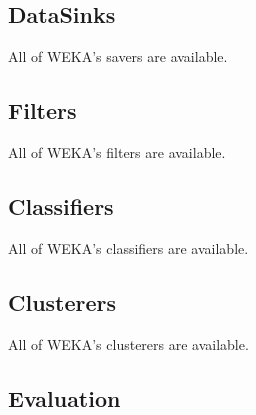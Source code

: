 \documentclass[a4paper]{article}
\begin{document}
\subsection{DataSinks} All of WEKA's savers are available.
\begin{center}
\end{center}

\subsection{Filters} All of WEKA's filters are available.
\begin{center}
\end{center}

\subsection{Classifiers} All of WEKA's classifiers are available.
\begin{center}
\end{center}

\subsection{Clusterers} All of WEKA's clusterers are available.
\begin{center}
\end{center}

\subsection{Evaluation}
\begin{center}
\end{center}
\end{document}

